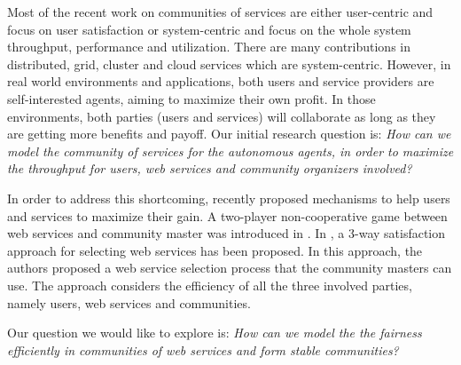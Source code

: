 Most of the recent work on communities of services are either
user-centric and focus on user satisfaction
\cite{Chun02user-centricperformance} or system-centric and focus
on the whole system throughput, performance and utilization. There
are many contributions in distributed, grid, cluster and cloud
services which are system-centric. However, in real world
environments and applications, both users and service providers
are self-interested agents, aiming to maximize their own profit.
In those environments, both parties (users and services) will
collaborate as long as they are getting more benefits and payoff. 
Our initial research question is:
\emph{How can we model the community of services for the autonomous agents, in order to maximize the throughput for users, web services and community organizers involved?}


In order to address this shortcoming, recently \cite{DBLP:conf/IEEEscc/LimTMB12,
DBLP:conf/IEEEscc/KhosravifarABT11, 10.1109/TSC.2012.12} proposed mechanisms to help
users and services to maximize their gain. A two-player
non-cooperative game between web services and community master was
introduced in \cite{DBLP:conf/IEEEscc/KhosravifarABT11}. 
In \cite{DBLP:conf/IEEEscc/LimTMB12}, a 3-way satisfaction approach
for selecting web services has been proposed. In this approach,
the authors proposed a web service selection process that the
community masters can use. The approach considers the efficiency
of all the three involved parties, namely users, web services and
communities. 



Our question we would like to explore is:
\emph{How can we model the the fairness efficiently in communities of web services and form stable communities?}


